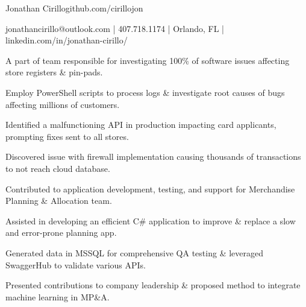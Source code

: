 \documentclass[]{deedy-resume-openfont}
\begin{document}
%
%


\namesection \LARGE {{Jonathan} {Cirillo}}{github.com/cirillojon}
\vspace{18pt}

{jonathancirillo@outlook.com | 407.718.1174 | Orlando, FL | linkedin.com/in/jonathan-cirillo/}


\vspace{6pt}



\vspace{\topsep} 

\begin{tightemize}
\item A part of team responsible for investigating 100\% of software issues affecting store registers \& pin-pads.
\item Employ PowerShell scripts to process logs \& investigate root causes of bugs affecting millions of customers.
\item Identified a malfunctioning API in production impacting card applicants, prompting fixes
sent to all stores.
\item Discovered issue with firewall implementation causing thousands of transactions to not reach cloud database.
\end{tightemize}
\sectionsep

\begin{tightemize}
\item Contributed to application development, testing, and support for Merchandise Planning \& Allocation team.
\item  Assisted in developing an efficient C\# application to improve \& replace a slow and error-prone planning app. 
\item  Generated data in MSSQL for comprehensive QA testing \& leveraged SwaggerHub to validate various APIs.
\item Presented contributions to company leadership \& proposed method to integrate machine learning in MP\&A.

\end{tightemize}
\sectionsep
\end{document}

